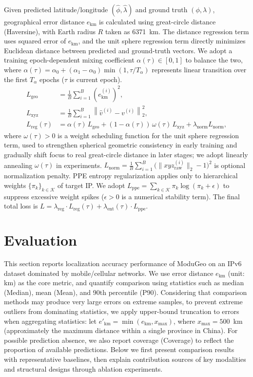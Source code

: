\documentclass[runningheads]{llncs}
\begin{document}
Given predicted latitude/longitude $(\hat{\phi},\hat{\lambda})$ and ground truth $(\phi,\lambda)$, geographical error distance $e_{\text{km}}$ is calculated using great-circle distance (Haversine), with Earth radius $R$ taken as 6371~km. The distance regression term uses squared error of $e_{\text{km}}$, and the unit sphere regression term directly minimizes Euclidean distance between predicted and ground-truth vectors. We adopt a training epoch-dependent mixing coefficient $\alpha(\tau)\in[0,1]$ to balance the two, where $\alpha(\tau)=\alpha_0+(\alpha_1-\alpha_0)\min(1,\tau/T_\alpha)$ represents linear transition over the first $T_\alpha$ epochs ($\tau$ is current epoch).
\begin{equation}
\begin{aligned}
L_{\text{geo}} &= \frac{1}{B}\sum_{i=1}^{B}\left(e_{\text{km}}^{(i)}\right)^2,\\
L_{\text{xyz}} &= \frac{1}{B}\sum_{i=1}^{B}\left\|\hat{v}^{(i)}-v^{(i)}\right\|_2^2,\\
L_{\text{reg}}(\tau) &= \alpha(\tau)\,L_{\text{geo}} + (1-\alpha(\tau))\,\omega(\tau)\,L_{\text{xyz}} + \lambda_{\text{norm}}L_{\text{norm}},
\end{aligned}
\label{eq:loss}
\end{equation}
where $\omega(\tau)>0$ is a weight scheduling function for the unit sphere regression term, used to strengthen spherical geometric consistency in early training and gradually shift focus to real great-circle distance in later stages; we adopt linearly annealing $\omega(\tau)$ in experiments. $L_{\text{norm}}=\frac{1}{B}\sum_{i=1}^{B}\big(\|xyz^{(i)}_{\text{raw}}\|_2-1\big)^2$ is optional normalization penalty. PPE entropy regularization applies only to hierarchical weights $\{\pi_k\}_{k\in\mathcal{K}}$ of target IP. We adopt $L_{\text{ppe}}=\sum_{k\in\mathcal{K}} \pi_k\log(\pi_k+\epsilon)$ to suppress excessive weight spikes ($\epsilon>0$ is a numerical stability term). The final total loss is $L = \lambda_{\text{reg}}\cdot L_{\text{reg}}(\tau) + \lambda_{\text{ent}}(\tau)\cdot L_{\text{ppe}}$.

\section{Evaluation}

This section reports localization accuracy performance of ModuGeo on an IPv6 dataset dominated by mobile/cellular networks. We use error distance $e_{\text{km}}$ (unit: km) as the core metric, and quantify comparison using statistics such as median (Median), mean (Mean), and 90th percentile (P90). Considering that comparison methods may produce very large errors on extreme samples, to prevent extreme outliers from dominating statistics, we apply upper-bound truncation to errors when aggregating statistics: let $e'_{\text{km}}=\min(e_{\text{km}},x_{\max})$, where $x_{\max}=500$~km (approximately the maximum distance within a single province in China). For possible prediction absence, we also report coverage (Coverage) to reflect the proportion of available predictions. Below we first present comparison results with representative baselines, then explain contribution sources of key modalities and structural designs through ablation experiments.
\end{document}
